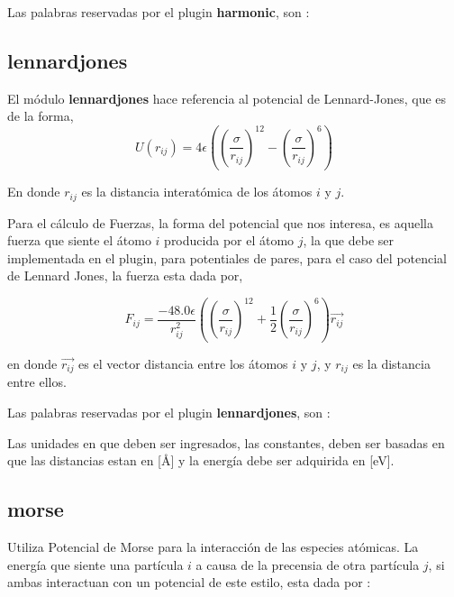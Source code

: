 Las palabras reservadas por el plugin \textbf{harmonic}, son :


\subsection{lennardjones}
El m\'odulo \textbf{lennardjones} hace referencia al potencial de Lennard-Jones,
que es de la forma,
$$U(r_{ij}) =
4\epsilon\left(\left(\frac{\sigma}{r_{ij}}\right)^{12}-\left(\frac{\sigma}{r_{ij
}}\right)^6\right)$$

En donde $r_{ij}$ es la distancia interat\'omica de los \'atomos $i$ y $j$. 

Para el c\'alculo de Fuerzas, la forma del potencial que nos interesa, es
aquella fuerza que siente el \'atomo $i$ producida por el \'atomo $j$, la que
debe ser implementada en el plugin, para potentiales de pares, para el caso del
potencial de Lennard Jones, la fuerza esta dada por,

$$F_{ij} = \frac{-48.0\epsilon}{r_{ij}^2}\left(
\left(\frac{\sigma}{r_{ij}}\right)^{12} +
\frac{1}{2}\left(\frac{\sigma}{r_{ij}}\right)^6 \right) \vec{r_{ij}}$$

en donde $\vec{r_{ij}}$ es el vector distancia entre los \'atomos $i$ y $j$, y
$r_{ij}$ es la distancia entre ellos. 

Las palabras reservadas por el plugin \textbf{lennardjones}, son :


Las unidades en que deben ser ingresados, las constantes, deben ser basadas en
que las distancias estan en [\AA] y la energ\'ia debe ser adquirida en [eV].

\subsection{morse}
Utiliza Potencial de Morse para la interacci\'on de las especies at\'omicas. La
energ\'ia que siente una part\'icula $i$ a causa de la precensia de otra
part\'icula $j$, si ambas interactuan con un potencial de este estilo, esta dada
por :

